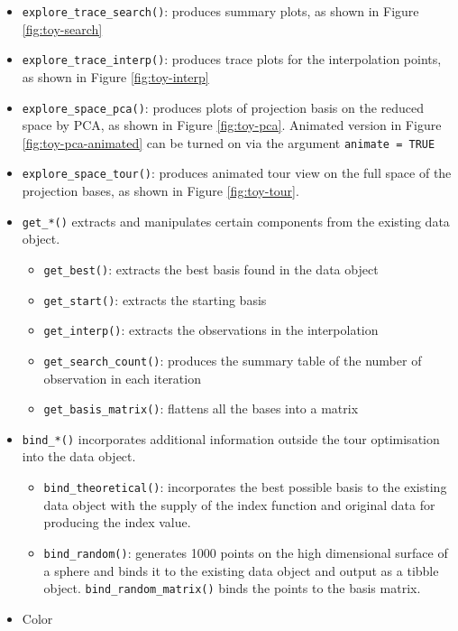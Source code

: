 \documentclass[12pt]{article}
\providecommand{\tightlist}{%
  \setlength{\itemsep}{0pt}\setlength{\parskip}{0pt}}
\begin{document}
\begin{itemize}
\item
  \texttt{explore\_trace\_search()}: produces summary plots, as shown in Figure \ref{fig:toy-search}
\item
  \texttt{explore\_trace\_interp()}: produces trace plots for the interpolation points, as shown in Figure \ref{fig:toy-interp}
\item
  \texttt{explore\_space\_pca()}: produces plots of projection basis on the reduced space by PCA, as shown in Figure \ref{fig:toy-pca}. Animated version in Figure \ref{fig:toy-pca-animated} can be turned on via the argument \texttt{animate\ =\ TRUE}
\item
  \texttt{explore\_space\_tour()}: produces animated tour view on the full space of the projection bases, as shown in Figure \ref{fig:toy-tour}.
\item
  \texttt{get\_*()} extracts and manipulates certain components from the existing data object.

  \begin{itemize}
  \tightlist
  \item
    \texttt{get\_best()}: extracts the best basis found in the data object
  \item
    \texttt{get\_start()}: extracts the starting basis
  \item
    \texttt{get\_interp()}: extracts the observations in the interpolation
  \item
    \texttt{get\_search\_count()}: produces the summary table of the number of observation in each iteration
  \item
    \texttt{get\_basis\_matrix()}: flattens all the bases into a matrix
  \end{itemize}
\item
  \texttt{bind\_*()} incorporates additional information outside the tour optimisation into the data object.

  \begin{itemize}
  \tightlist
  \item
    \texttt{bind\_theoretical()}: incorporates the best possible basis to the existing data object with the supply of the index function and original data for producing the index value.
  \item
    \texttt{bind\_random()}: generates 1000 points on the high dimensional surface of a sphere and binds it to the existing data object and output as a tibble object. \texttt{bind\_random\_matrix()} binds the points to the basis matrix.
  \end{itemize}
\item
  Color


\end{itemize}
\end{document}
